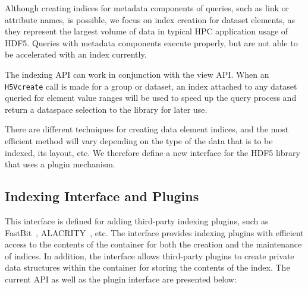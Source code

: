 \documentclass[letterpaper,hyper]{THG_RFC}
\begin{document}
Although creating indices for metadata components of queries, such as link or
attribute names, is possible, we focus on index creation for dataset elements,
as they represent the largest volume of data in typical HPC application usage of
HDF5. Queries with metadata components execute properly,
 but are not able to be accelerated
with an index currently.

The indexing API can work in conjunction with the view API. When an \texttt{H5Vcreate}
call is made for a group or dataset, an index attached to any dataset queried
for element value ranges will be used to speed up the query process and return
a dataspace selection to the library for later use.

There are different techniques for creating data element indices, and the most
efficient method will vary depending on the type of the data that is to be
indexed, its layout, etc. We therefore define a new interface for the HDF5
library that uses a plugin mechanism.

\subsection{Indexing Interface and Plugins}

This interface is defined for adding third-party indexing plugins,
such as FastBit~\cite{Wu05}, ALACRITY~\cite{alacrity13}, etc.
The interface provides indexing plugins with efficient access to the contents of
the container for both the creation and the maintenance of indices. In addition,
the interface allows third-party plugins to create private data structures
within the container for storing the contents of the index.
The current API as well as the plugin interface are presented below:
\end{document}
